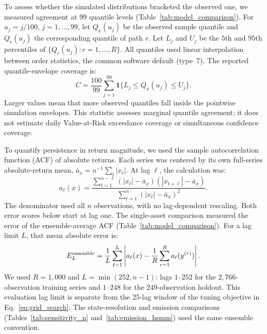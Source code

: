 To assess whether the simulated distributions bracketed the observed
one, we measured agreement at $99$ quantile levels
(Table~\ref{tab:model_comparison}). For $u_j=j/100$, $j=1,\ldots,99$,
let $Q_x(u_j)$ be the observed sample quantile and
$Q_r(u_j)$ the corresponding quantile of path $r$. Let
$L_j$ and $U_j$ be the $5$th and $95$th percentiles of
$\{Q_r(u_j):r=1,\ldots,R\}$. All quantiles used linear interpolation
between order statistics, the common software default (type~7). The reported
quantile-envelope coverage is:
\begin{equation}
 C=\frac{100}{99}\sum_{j=1}^{99}
       \mathbf{1}\{L_j\le Q_x(u_j)\le U_j\}.
 \label{eq:quantile-envelope-coverage}
\end{equation}
Larger values mean that more observed quantiles fall inside the
pointwise simulation envelopes. This statistic assesses marginal
quantile agreement; it does not estimate daily Value-at-Risk
exceedance coverage or simultaneous confidence coverage.

To quantify persistence in return magnitude, we used the sample
autocorrelation function (ACF) of absolute returns. Each series was
centered by its own full-series absolute-return mean,
$\bar a_x=n^{-1}\sum_t|x_t|$. At lag $\ell$, the calculation was:
\begin{equation}
 a_\ell(x)=
 \frac{\sum_{t=1}^{n-\ell}(|x_t|-\bar a_x)(|x_{t+\ell}|-\bar a_x)}
      {\sum_{t=1}^{n}(|x_t|-\bar a_x)^2}.
 \label{eq:sample-absolute-acf}
\end{equation}
The denominator used all $n$ observations, with no lag-dependent
rescaling. Both error scores below start at lag one.
The single-asset comparison measured the error of the ensemble-average
ACF (Table~\ref{tab:model_comparison}). For a lag limit $L$, that
mean absolute error is:
\begin{equation}
 E^{\rm ensemble}_L=\frac{1}{L}\sum_{\ell=1}^{L}
 \left|a_\ell(x)-\frac{1}{R}\sum_{r=1}^{R}a_\ell(y^{(r)})\right|.
 \label{eq:acf-ensemble-error}
\end{equation}
We used $R=1{,}000$ and $L=\min(252,n-1)$: lags $1$--$252$
for the $2{,}766$-observation training series and $1$--$248$ for the
$249$-observation holdout. This evaluation lag limit is separate from
the $25$-lag window of the tuning objective in
Eq.~\eqref{eq:grid_search}. The state-resolution and emission
comparisons (Tables~\ref{tab:sensitivity_n}
and~\ref{tab:emission_hsmm}) used the same ensemble convention.

